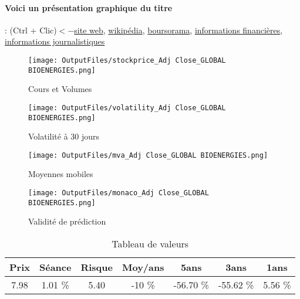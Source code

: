 \documentclass[11pt,a4paper]{report}%
\begin{document}
\paragraph{Voici un présentation graphique du titre} : (Ctrl + Clic)$<-$\href{https://www.global-bioenergies.com/}{site web}, \href{https://fr.wikipedia.org/wiki/Global_Bioenergies}{wikipédia}, \href{https://www.boursorama.com/cours/1rPALGBE}{boursorama}, \href{https://www.qwant.com/?q=site:https:%2f%2fwww.easybourse.com%2faction-societe%2fGLOBAL-BIOENERGIES&t=web&client=ext-firefox-hp}{informations financières}, \href{https://bourse.lerevenu.com/cours-de-bourse/fiche-valeur-synthese/GLOBAL-BIOENERGIES/ALGBE-FR}{informations journalistiques}
\begin{figure}[!htb]
   \begin{minipage}{0.5\textwidth}
     \centering
     \texttt{[image: OutputFiles/stockprice\_Adj Close\_GLOBAL BIOENERGIES.png]}
     \caption{Cours et Volumes}\label{Fig:price_GLOBAL BIOENERGIES}
   \end{minipage}\hfill
   \begin{minipage}{0.5\textwidth}
     \centering
     \texttt{[image: OutputFiles/volatility\_Adj Close\_GLOBAL BIOENERGIES.png]}
     \caption{Volatilité à 30 jours}\label{Fig:volat_GLOBAL BIOENERGIES}
   \end{minipage}
\end{figure}
\begin{figure}[!htb]
   \begin{minipage}{0.5\textwidth}
     \centering
     \texttt{[image: OutputFiles/mva\_Adj Close\_GLOBAL BIOENERGIES.png]}
     \caption{Moyennes mobiles}\label{Fig:mva_GLOBAL BIOENERGIES}
   \end{minipage}\hfill
   \begin{minipage}{0.5\textwidth}
     \centering
     \texttt{[image: OutputFiles/monaco\_Adj Close\_GLOBAL BIOENERGIES.png]}
     \caption{Validité de prédiction}\label{Fig:prediction_GLOBAL BIOENERGIES}
   \end{minipage}
\end{figure}

\begin{table}[H]
  \centering
    \begin{tabular}{|c|c|c|c|c|c|c|}
    \hline
    Prix & Séance & Risque  & Moy/ans & 5ans & 3ans & 1ans \\
    \hline
    7.98 &    1.01 \%    & 5.40 & -10 \% & -56.70 \% & -55.62 \% & 5.56 \% \\
    \hline
    \end{tabular}%
        \label{tab:table_GLOBAL BIOENERGIES}%
      \caption{Tableau de valeurs}
\end{table}%
\end{document}
